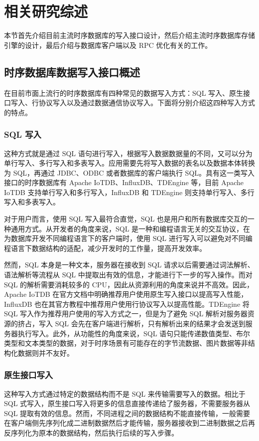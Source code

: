 
\chapter{相关研究综述}
本节首先介绍目前主流时序数据库的写入接口设计，然后介绍主流时序数据库存储引擎的设计，最后介绍与数据库客户端以及 RPC 优化有关的工作。
\section{时序数据库数据写入接口概述}
在目前市面上流行的时序数据库有四种常见的数据写入方式：SQL 写入、原生接口写入、行协议写入以及通过数据通信协议写入。下面将分别介绍这四种写入方式的特点。
\subsection{SQL 写入}
这种方式就是通过 SQL 语句进行写入，根据写入数据数据量的不同，又可以分为单行写入、多行写入和多表写入。应用需要先将写入数据的表名以及数据本体转换为 SQL，再通过 JDBC、ODBC 或者数据库的客户端执行 SQL。具有这一类写入接口的时序数据库有 Apache IoTDB、InfluxDB、TDEngine 等，目前 Apache IoTDB 支持单行写入和多行写入，InfluxDB 和 TDEngine 则支持单行写入、多行写入和多表写入。

对于用户而言，使用 SQL 写入最符合直觉，SQL 也是用户和所有数据库交互的一种通用方式。从开发者的角度来说，SQL 是一种和编程语言无关的交互协议，在为数据库开发不同编程语言下的客户端时，使用 SQL 进行写入可以避免对不同编程语言下数据结构的适配，减少开发时的工作量，提高开发效率。

然而，SQL 本身是一种文本，服务器在接收到 SQL 请求以后需要通过词法解析、语法解析等流程从 SQL 中提取出有效的信息，才能进行下一步的写入操作。而对 SQL 的解析需要消耗较多的 CPU，因此从资源利用的角度来说并不高效。因此，Apache IoTDB 在官方文档中明确推荐用户使用原生写入接口以提高写入性能\cite{iotdb2024javanative}，InfluxDB 也在其官方教程中推荐用户使用行协议写入以提高性能\cite{influx2024highperformance}。TDEngine 将 SQL 写入作为推荐用户使用的写入方式之一，但是为了避免 SQL 解析对服务器资源的挤占，写入 SQL 会先在客户端进行解析，只有解析出来的结果才会发送到服务器执行写入。此外，从功能性的角度来说，SQL 语句只能传递数值类型、布尔类型和文本类型的数据，对于时序场景有可能存在的字节流数据、图片数据等非结构化数据则并不友好。
\subsection{原生接口写入}
这种写入方式通过特定的数据结构而不是 SQL 来传输需要写入的数据。相比于 SQL 式写入，原生接口写入将更多的信息直接传递给了服务器，不需要服务器从 SQL 提取有效的信息。然而，不同进程之间的数据结构不能直接传输，一般需要在客户端侧先序列化成二进制数据然后才能传输，服务器接收到二进制数据之后再反序列化为原本的数据结构，然后执行后续的写入步骤。

